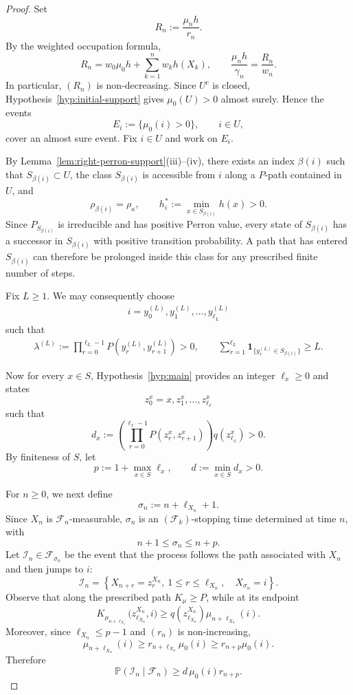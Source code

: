 \documentclass[10pt,letterpaper]{article}
\theoremstyle{compactplain}
\theoremstyle{compactdefinition}
\newcommand{\1}{\mathds{1}}
\begin{document}
\begin{proof}
Set
\[
R_n:=\frac{\mu_nh}{r_n}.
\]
By the weighted occupation formula,
\[
R_n
=
w_0\mu_0h+\sum_{k=1}^n w_kh(X_k),
\qquad
\frac{\mu_nh}{\gamma_n}
=
\frac{R_n}{w_n}.
\]
In particular, \((R_n)\) is non-decreasing. Since \(U^c\) is closed, Hypothesis~\ref{hyp:initial-support} gives
\(\mu_0(U)>0\) almost surely. Hence the events
\[
E_i:=\{\mu_0(i)>0\},
\qquad i\in U,
\]
cover an almost sure event. Fix \(i\in U\) and work on \(E_i\).


By Lemma~\ref{lem:right-perron-support}\textup{(iii)--(iv)}, there exists an
index \(\beta(i)\) such that \(S_{\beta(i)}\subset U\), the
class \(S_{\beta(i)}\) is accessible from \(i\) along a \(P\)-path contained
in \(U\), and
\[
\rho_{\beta(i)}=\rho_\kappa,
\qquad
h_i^*:=\min_{x\in S_{\beta(i)}}h(x)>0.
\]
Since \(P_{S_{\beta(i)}}\) is irreducible and has positive Perron value, every
state of \(S_{\beta(i)}\) has a successor in \(S_{\beta(i)}\) with positive
transition probability. A path that has entered \(S_{\beta(i)}\) can therefore
be prolonged inside this class for any prescribed finite number of steps.

Fix \(L\geq1\). We may consequently choose
\begin{align}\label{eq:i-path-L-visits}
    i=y_0^{(L)},y_1^{(L)},\ldots,y_{\ell_L}^{(L)}
\end{align}
such that
\begin{align}\label{eq:lambda^L-visits}
\lambda^{(L)}
:=
\prod_{r=0}^{\ell_L-1}
P(y_r^{(L)},y_{r+1}^{(L)})
>0,
\qquad
\sum_{r=1}^{\ell_L}
\mathbf 1_{\{y_r^{(L)}\in S_{\beta(i)}\}}
\geq L.
\end{align}


Now for every \(x\in S\), Hypothesis~\ref{hyp:main} provides an integer \(\ell_x\geq0\) and states
\[
z_0^x=x,z_1^x,\ldots,z_{\ell_x}^x
\]
such that
\[
d_x
:=
\left(
\prod_{r=0}^{\ell_x-1}
P(z_r^x,z_{r+1}^x)
\right)
q(z_{\ell_x}^x)
>0.
\]
By finiteness of \(S\), let
\[
p:=1+\max_{x\in S}\ell_x,
\qquad
d:=\min_{x\in S}d_x>0.
\]

For \(n\geq0\), we next define 
\[
\sigma_n:=n+\ell_{X_n}+1. 
\]
Since \(X_n\) is \(\mathcal F_n\)-measurable, \(\sigma_n\) is an
\((\mathcal F_k)\)-stopping time determined at time \(n\), with
\[
n+1\leq\sigma_n\leq n+p.
\]
Let \(\mathcal I_n\in\mathcal F_{\sigma_n}\) be the event that the process follows the path associated with \(X_n\) and then jumps to \(i\):
\[
\mathcal I_n
=
\left\{
X_{n+r}=z_r^{X_n},\ 1\leq r\leq\ell_{X_n},
\quad
X_{\sigma_n}=i
\right\}.
\]
Observe that along the prescribed path \(K_\mu\geq P\), while at its endpoint
\[
K_{\mu_{n+\ell_{X_n}}}
\bigl(z_{\ell_{X_n}}^{X_n},i\bigr)
\geq
q(z_{\ell_{X_n}}^{X_n})
\mu_{n+\ell_{X_n}}(i).
\]
Moreover, since \(\ell_{X_n}\leq p-1\) and \((r_n)\) is non-increasing,
\[
\mu_{n+\ell_{X_n}}(i)
\geq
r_{n+\ell_{X_n}}\mu_0(i)
\geq
r_{n+p}\mu_0(i).
\]
Therefore
\[
\mathbb P(\mathcal I_n\mid\mathcal F_n)
\geq
d\,\mu_0(i)r_{n+p}.
\]


\end{proof}
\end{document}
